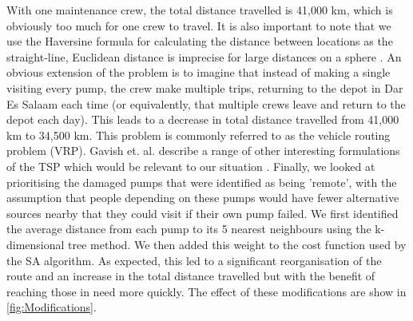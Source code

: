 \documentclass{article} %
\begin{document}
\begin{multicols}{2}
With one maintenance crew, the total distance travelled is 41,000 km, which is obviously too much for one crew to travel. It is also important to note that we use the Haversine formula for calculating the distance between locations as the straight-line, Euclidean distance is imprecise for large distances on a sphere \cite{Sinnot1983}. An obvious extension of the problem is to imagine that instead of making a single visiting every pump, the crew make multiple trips, returning to the depot in Dar Es Salaam each time (or equivalently, that multiple crews leave and return to the depot each day). This leads to a decrease in total distance travelled from 41,000 km to 34,500 km. This problem is commonly referred to as the vehicle routing problem (VRP). Gavish et. al. describe a range of other interesting formulations of the TSP which would be relevant to our situation \cite{Gavish1978}. Finally, we looked at prioritising the damaged pumps that were identified as being 'remote', with the assumption that people depending on these pumps would have fewer alternative sources nearby that they could visit if their own pump failed. We first identified the average distance from each pump to its 5 nearest neighbours using the k-dimensional tree method. We then added this weight to the cost function used by the SA algorithm. As expected, this led to a significant reorganisation of the route and an increase in the total distance travelled but with the benefit of reaching those in need more quickly. The effect of these modifications are show in \ref{fig:Modifications}.


\end{multicols}
\end{document}
